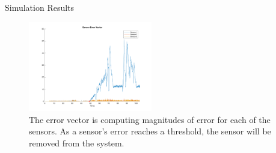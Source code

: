 \begin{section}{Simulation Results}
\begin{figure}
\vspace{1pt}
\centering
\includegraphics[width=0.48\textwidth]{Error_Vector.png}
\caption{The error vector is computing magnitudes of error for each of the sensors. As a sensor's error reaches a threshold, the sensor will be removed from the system.}
\label{fig:sensor error}
\end{figure}





\end{section}
